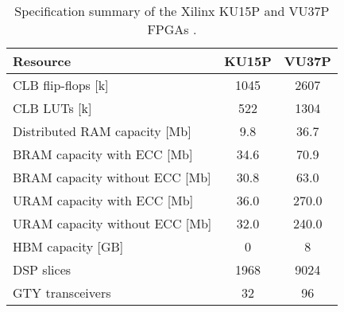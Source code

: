 \begin{table}[h]
  \centering
  \caption{Specification summary of the Xilinx KU15P and VU37P FPGAs \cite{xilinx-fpga}.}
  \label{tab:fpga}
  \begin{tabular}{ l | c | c }
    \textbf{Resource}               & \textbf{KU15P}  & \textbf{VU37P} \\ \hline
    CLB flip-flops [k]              & 1045            & 2607 \\
    CLB LUTs [k]                    & 522             & 1304 \\
    Distributed RAM capacity [Mb]   & 9.8             & 36.7 \\ %
    BRAM capacity with ECC [Mb]     & 34.6             & 70.9 \\ %
    BRAM capacity without ECC [Mb]  & 30.8             & 63.0 \\ %
    URAM capacity with ECC [Mb]     & 36.0             & 270.0 \\ %
    URAM capacity without ECC [Mb]  & 32.0             & 240.0 \\ %
    HBM capacity [GB]               & 0               & 8 \\
    DSP slices                      & 1968            & 9024 \\
    GTY transceivers                & 32              & 96 \\
  \end{tabular}
\end{table}



